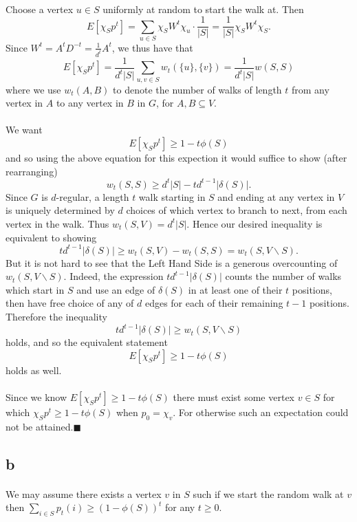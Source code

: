 \documentclass[letterpaper,12pt,oneside,onecolumn]{article}
\begin{document}
	\paragraph{}
	Choose a vertex $u \in S$ uniformly at random to start the walk at. Then
	$$E[\chi_Sp^t] = \sum_{u \in S} \chi_SW^t\chi_u \cdot\frac{1}{|S|} = \frac{1}{|S|}\chi_SW^t\chi_S.$$
	Since $W^t = A^tD^{-t} = \frac{1}{d^t}A^t$, we thus have that
	$$E[\chi_Sp^t] = \frac{1}{d^t|S|}\sum_{u,v\in S}w_t(\{u\},\{v\}) = \frac{1}{d^t|S|}w(S,S)$$
	where we use $w_t(A,B)$ to denote the number of walks of length $t$ from any vertex in $A$ to any vertex in $B$ in $G$, for $A, B\subseteq V$.
	\paragraph{}
	We want
	$$E[\chi_S p^t] \geq 1-t\phi(S)$$
	and so using the above equation for this expection it would suffice to show (after rearranging)
	$$w_t(S,S) \geq d^t|S| - td^{t-1}|\delta(S)|.$$
	Since $G$ is $d$-regular, a length $t$ walk starting in $S$ and ending at any vertex in $V$ is uniquely determined by $d$ choices of which vertex to branch to next, from each vertex in the walk. Thus $w_t(S,V) = d^t|S|$. Hence our desired inequality is equivalent to showing
	$$td^{t-1}|\delta(S)| \geq w_t(S,V) - w_t(S,S) = w_t(S,V\backslash S).$$
	But it is not hard to see that the Left Hand Side is a generous overcounting of $w_t(S,V\backslash S).$ Indeed, the expression $td^{t-1}|\delta(S)|$ counts the number of walks which start in $S$ and use an edge of $\delta(S)$ in at least one of their $t$ positions, then have free choice of any of $d$ edges for each of their remaining $t-1$ positions. Therefore the inequality
	$$td^{t-1}|\delta(S)| \geq w_t(S,V\backslash S)$$
	holds, and so the equivalent statement
	$$E[\chi_S p^t] \geq 1-t\phi(S)$$
	holds as well.
	\paragraph{}
	Since we know $E[\chi_S p^t] \geq 1-t\phi(S)$ there must exist some vertex $v \in S$ for which $\chi_S p^t \geq 1-t\phi(S)$ when $p_0 = \chi_v$. For otherwise such an expectation could not be attained.$\blacksquare$
	\subsection{b}
	\paragraph{}
	We may assume there exists a vertex $v$ in $S$ such if we start the random walk at $v$ then $\sum_{i \in S}p_t(i)\geq (1-\phi(S))^t$ for any $t\geq 0$.
\end{document}
